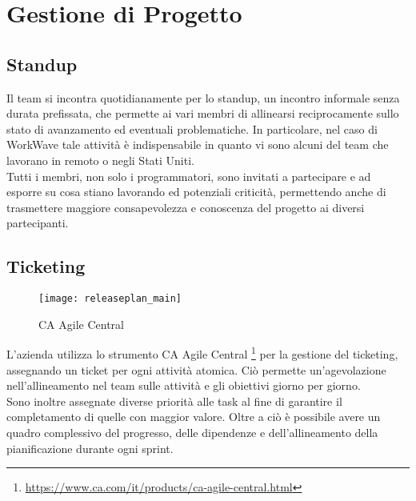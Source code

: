 \section{Gestione di Progetto}

\subsection{Standup}

Il team si incontra quotidianamente per lo standup, un incontro informale senza durata prefissata, che permette ai vari membri di allinearsi reciprocamente sullo stato di avanzamento ed eventuali problematiche. In particolare, nel caso di WorkWave tale attività è indispensabile in quanto vi sono alcuni del team che lavorano in remoto o negli Stati Uniti. \\

Tutti i membri, non solo i programmatori, sono invitati a partecipare e ad esporre su cosa stiano lavorando ed potenziali criticità, permettendo anche di trasmettere maggiore consapevolezza e conoscenza del progetto ai diversi partecipanti.

\subsection{Ticketing}

\begin{figure}[H] 
  \centering 
  \texttt{[image: releaseplan\_main]} 
  \caption{CA Agile Central}
\end{figure}

L'azienda utilizza lo strumento CA Agile Central \footnote{ \url{https://www.ca.com/it/products/ca-agile-central.html}} per la gestione del ticketing, assegnando un ticket per ogni attività atomica. Ciò permette un'agevolazione nell'allineamento nel team sulle attività e gli obiettivi giorno per giorno. \\

Sono inoltre assegnate diverse priorità alle task al fine di garantire il completamento di quelle con maggior valore. Oltre a ciò è possibile avere un quadro complessivo del progresso, delle dipendenze e dell'allineamento della pianificazione durante ogni \gls{sprint}.
